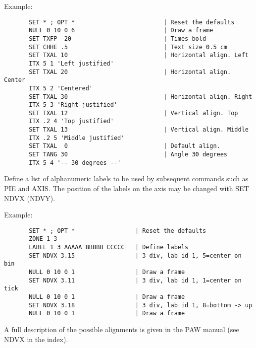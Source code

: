    \par
Example:  
\begin{verbatim}
       SET * ; OPT *                         | Reset the defaults
       NULL 0 10 0 6                         | Draw a frame
       SET TXFP -20                          | Times bold
       SET CHHE .5                           | Text size 0.5 cm
       SET TXAL 10                           | Horizontal align. Left
       ITX 5 1 'Left justified'
       SET TXAL 20                           | Horizontal align. Center
       ITX 5 2 'Centered'
       SET TXAL 30                           | Horizontal align. Right
       ITX 5 3 'Right justified'
       SET TXAL 12                           | Vertical align. Top
       ITX .2 4 'Top justified'
       SET TXAL 13                           | Vertical align. Middle
       ITX .2 5 'Middle justified'
       SET TXAL  0                           | Default align.
       SET TANG 30                           | Angle 30 degrees
       ITX 5 4 '-- 30 degrees --'
\end{verbatim}

\ENDCMD


\BEGARG
{}
\ENDARG

   \par
Define a list of alphanumeric labels to be used by subsequent commands such 
   as PIE and AXIS. The position of the labels on the axis may be changed with 
   SET NDVX (NDVY).  

   \par
Example:  
\begin{verbatim}
       SET * ; OPT *                 | Reset the defaults
       ZONE 1 3
       LABEL 1 3 AAAAA BBBBB CCCCC   | Define labels
       SET NDVX 3.15                 | 3 div, lab id 1, 5=center on bin
       NULL 0 10 0 1                 | Draw a frame
       SET NDVX 3.11                 | 3 div, lab id 1, 1=center on tick
       NULL 0 10 0 1                 | Draw a frame
       SET NDVX 3.18                 | 3 div, lab id 1, 8=bottom -> up
       NULL 0 10 0 1                 | Draw a frame
\end{verbatim}
\ENDVERB
   \par
A full description of the possible alignments is given in the PAW manual 
   (see NDVX in the index).  

